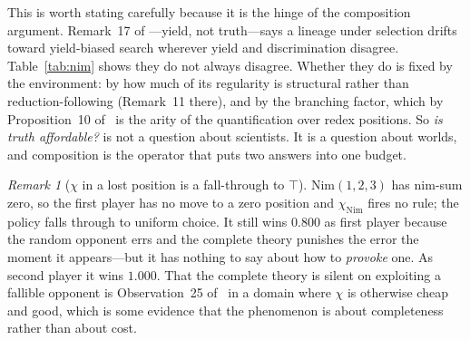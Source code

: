 \documentclass[11pt,a4paper]{article}
\theoremstyle{plain}
\theoremstyle{definition}
\theoremstyle{remark}
\newtheorem{remark}[theorem]{Remark}
\begin{document}
This is worth stating carefully because it is the hinge of the composition argument. Remark~17 of
\cite{scientist}---yield, not truth---says a lineage under selection drifts toward yield-biased
search wherever yield and discrimination disagree. Table~\ref{tab:nim} shows they do not always
disagree. Whether they do is fixed by the environment: by how much of its regularity is
structural rather than reduction-following (Remark~11 there), and by the branching factor, which
by Proposition~10 of~\cite{game} is the arity of the quantification over redex positions. So
\emph{is truth affordable?} is not a question about scientists. It is a question about worlds, and
composition is the operator that puts two answers into one budget.

\begin{remark}[$\chi$ in a lost position is a fall-through to $\top$]
Nim$(1,2,3)$ has nim-sum zero, so the first player has no move to a zero position and
$\chi_{\mathrm{Nim}}$ fires no rule; the policy falls through to uniform choice. It still wins
$0.800$ as first player because the random opponent errs and the complete theory punishes the
error the moment it appears---but it has nothing to say about how to \emph{provoke} one. As
second player it wins $1.000$. That the complete theory is silent on exploiting a fallible
opponent is Observation~25 of~\cite{game} in a domain where $\chi$ is otherwise cheap and good,
which is some evidence that the phenomenon is about completeness rather than about cost.
\end{remark}
\end{document}
